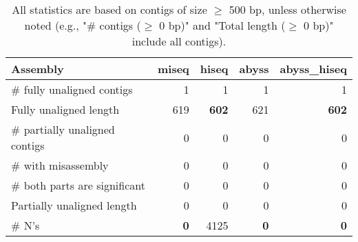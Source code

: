 \documentclass[12pt,a4paper]{article}
\begin{document}
\begin{table}[ht]
\begin{center}
\caption{All statistics are based on contigs of size $\geq$ 500 bp, unless otherwise noted (e.g., "\# contigs ($\geq$ 0 bp)" and "Total length ($\geq$ 0 bp)" include all contigs).}
\begin{tabular}{|l*{4}{|r}|}
\hline
Assembly & miseq & hiseq & abyss & abyss\_hiseq \\ \hline
\# fully unaligned contigs & 1 & 1 & 1 & 1 \\ \hline
Fully unaligned length & 619 & {\bf 602} & 621 & {\bf 602} \\ \hline
\# partially unaligned contigs & 0 & 0 & 0 & 0 \\ \hline
\hspace{5mm}\# with misassembly & 0 & 0 & 0 & 0 \\ \hline
\hspace{5mm}\# both parts are significant & 0 & 0 & 0 & 0 \\ \hline
Partially unaligned length & 0 & 0 & 0 & 0 \\ \hline
\# N's & {\bf 0} & 4125 & {\bf 0} & {\bf 0} \\ \hline
\end{tabular}
\end{center}
\end{table}
\end{document}
